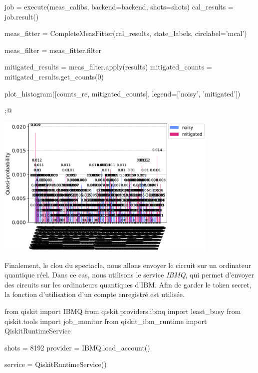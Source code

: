 \begin{pyin}
job = execute(meas_calibs, backend=backend, shots=shots)
cal_results = job.result()

meas_fitter = CompleteMeasFitter(cal_results, state_labels, circlabel='mcal')
\end{pyin}

\begin{pyin}
meas_filter = meas_fitter.filter

mitigated_results = meas_filter.apply(results)
mitigated_counts = mitigated_results.get_counts(0)
\end{pyin}

\begin{pyin}
plot_histogram([counts_re, mitigated_counts], legend=['noisy', 'mitigated'])
\end{pyin}

\begin{pyout}
;@ \begin{center}\includegraphics[width=0.8\textwidth]{images/appendix/out14.eps}\end{center}
\end{pyout}

Finalement, le clou du spectacle, nous allons envoyer le circuit sur un ordinateur quantique réel.
Dans ce cas, nous utilisons le service \emph{IBMQ}, qui permet d'envoyer des circuits sur les ordinateurs
quantiques d'IBM\@.
Afin de garder le token secret, la fonction d'utilisation d'un compte enregistré est utilisée.\\

\begin{pyin}
from qiskit import IBMQ
from qiskit.providers.ibmq import least_busy
from qiskit.tools import job_monitor
from qiskit_ibm_runtime import QiskitRuntimeService

shots = 8192
provider = IBMQ.load_account()

service = QiskitRuntimeService()
\end{pyin}

